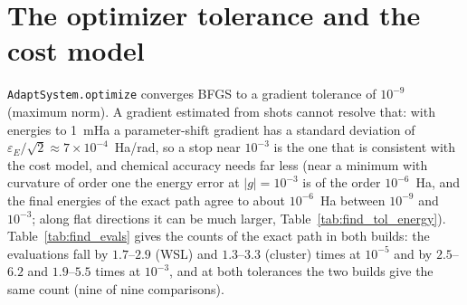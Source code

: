 \documentclass[11pt]{article}
\begin{document}
\section{The optimizer tolerance and the cost model}\label{sec:gtol}

\texttt{AdaptSystem.optimize} converges BFGS to a gradient tolerance of $10^{-9}$ (maximum norm). A gradient estimated from shots cannot resolve that: with energies to 1~mHa a parameter-shift gradient has a standard deviation of $\varepsilon_E/\sqrt2\approx7\times10^{-4}$~Ha/rad, so a stop near $10^{-3}$ is the one that is consistent with the cost model, and chemical accuracy needs far less
(near a minimum with curvature of order one the energy error at $|g|=10^{-3}$ is of the order $10^{-6}$~Ha, and the final energies of the exact path agree to about $10^{-6}$~Ha between $10^{-9}$ and $10^{-3}$; along flat directions it can be much larger, Table~\ref{tab:find_tol_energy}). Table~\ref{tab:find_evals} gives the counts of the exact path in both builds: the evaluations fall by $1.7$--$2.9$ (WSL) and $1.3$--$3.3$ (cluster) times at $10^{-5}$ and by $2.5$--$6.2$ and $1.9$--$5.5$ times at $10^{-3}$, and at both tolerances the two builds give the same count (nine of nine comparisons).
\end{document}
